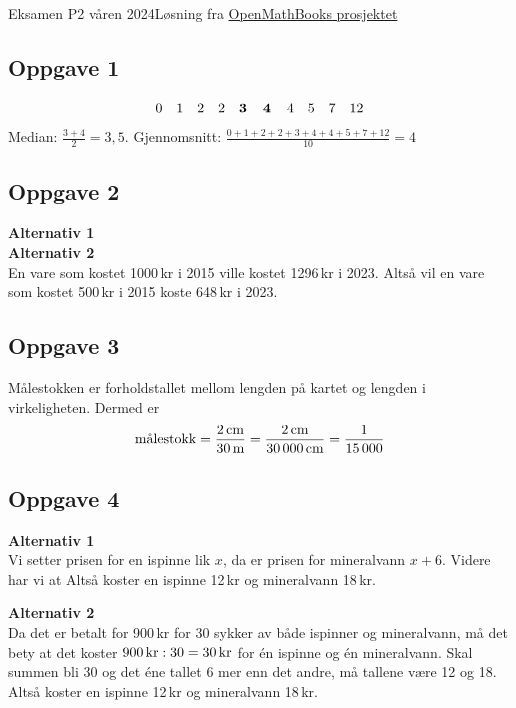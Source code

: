 





{\Large Eksamen P2 våren 2024\hfill {\footnotesize Løsning fra \color{blue} \href{https://sindreheggen.wordpress.com/}{OpenMathBooks prosjektet}}}	
\subsection*{Oppgave 1}
\[ 0\quad 1\quad 2\quad 2\quad {\textbf{3\quad 4\quad}} 4\quad 5\quad 7\quad 12 \]
Median: $\frac{3+4}{2}=3,5$. \os 
Gjennomsnitt: $\frac{0+1+2+2+3+4+4+5+7+12}{10}=4$ 

\subsection*{Oppgave 2}
\textbf{Alternativ 1}\\
\textbf{Alternativ 2}\\
En vare som kostet 1000\,kr i 2015 ville kostet 1296\,kr i 2023. Altså vil en vare som kostet 500\,kr i 2015 koste 648\,kr i 2023.  

\subsection*{Oppgave 3}
Målestokken er forholdstallet mellom lengden på kartet og lengden i virkeligheten. Dermed er
\[ \text{målestokk}=\frac{2\,\text{cm}}{30\,\text{m}}=\frac{2\,\text{cm}}{30\,000\,\text{cm}}=\frac{1}{15\,000} \]

\newpage
\subsection*{Oppgave 4}
\textbf{Alternativ 1}\\
Vi setter prisen for en ispinne lik $x$, da er prisen for mineralvann $x+6$. Videre har vi at
Altså koster en ispinne 12\,kr og mineralvann 18\,kr. \os

\textbf{Alternativ 2} \\
Da det er betalt for 900\,kr for 30 sykker av både ispinner og mineralvann, må det bety at det koster $900\,\text{kr}:30=30\,\text{kr}$ for én ispinne og én mineralvann. Skal summen bli 30 og det éne tallet 6 mer enn det andre, må tallene være 12 og 18. Altså koster en ispinne 12\,kr og mineralvann 18\,kr.

